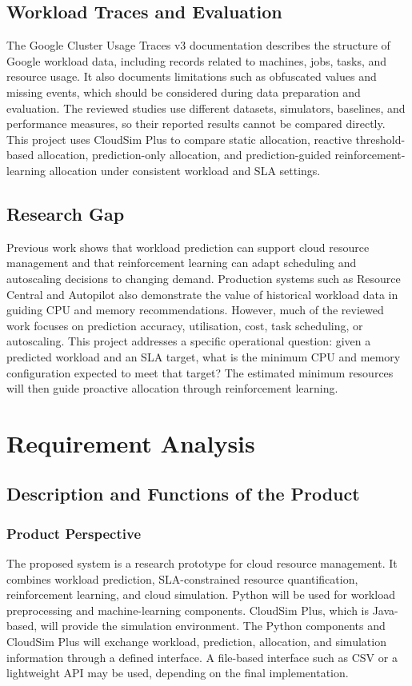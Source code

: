 \documentclass[12pt,a4paper]{report}
\begin{document}
\section{Workload Traces and Evaluation}
The Google Cluster Usage Traces v3 documentation describes the structure of Google workload data, including records related to machines, jobs, tasks, and resource usage. It also documents limitations such as obfuscated values and missing events, which should be considered during data preparation and evaluation.
The reviewed studies use different datasets, simulators, baselines, and performance measures, so their reported results cannot be compared directly. This project uses CloudSim Plus to compare static allocation, reactive threshold-based allocation, prediction-only allocation, and prediction-guided reinforcement-learning allocation under consistent workload and SLA settings.
\lipsum[24-25]

\section{Research Gap}
Previous work shows that workload prediction can support cloud resource management and that reinforcement learning can adapt scheduling and autoscaling decisions to changing demand. Production systems such as Resource Central and Autopilot also demonstrate the value of historical workload data in guiding CPU and memory recommendations.
However, much of the reviewed work focuses on prediction accuracy, utilisation, cost, task scheduling, or autoscaling. This project addresses a specific operational question: given a predicted workload and an SLA target, what is the minimum CPU and memory configuration expected to meet that target? The estimated minimum resources will then guide proactive allocation through reinforcement learning.
\lipsum[26-28]

\chapter{Requirement Analysis}
\section{Description and Functions of the Product}
\subsection{Product Perspective}
The proposed system is a research prototype for cloud resource management. It combines workload prediction, SLA-constrained resource quantification, reinforcement learning, and cloud simulation. Python will be used for workload preprocessing and machine-learning components. CloudSim Plus, which is Java-based, will provide the simulation environment.
The Python components and CloudSim Plus will exchange workload, prediction, allocation, and simulation information through a defined interface. A file-based interface such as CSV or a lightweight API may be used, depending on the final implementation.
\lipsum[29-30]
\end{document}
